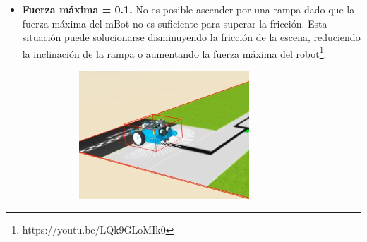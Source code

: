 \begin{itemize}

  \item \textbf{Fuerza máxima = 0.1.} No es posible ascender por una rampa dado que la fuerza máxima del mBot no es suficiente para superar la fricción. Esta situación puede solucionarse disminuyendo la fricción de la escena, reduciendo la inclinación de la rampa o aumentando la fuerza máxima del robot\footnote{https://youtu.be/LQk9GLoMIk0}.
    
    \begin{figure}[h!]
  \begin{subfigure}[b]{0.3\textwidth}
    \includegraphics[width=\textwidth, height=\textwidth]{rampa1.png}
  \end{subfigure}
  \hfill
  \begin{subfigure}[b]{0.3\textwidth}

\end{subfigure}
\end{figure}
\end{itemize}

